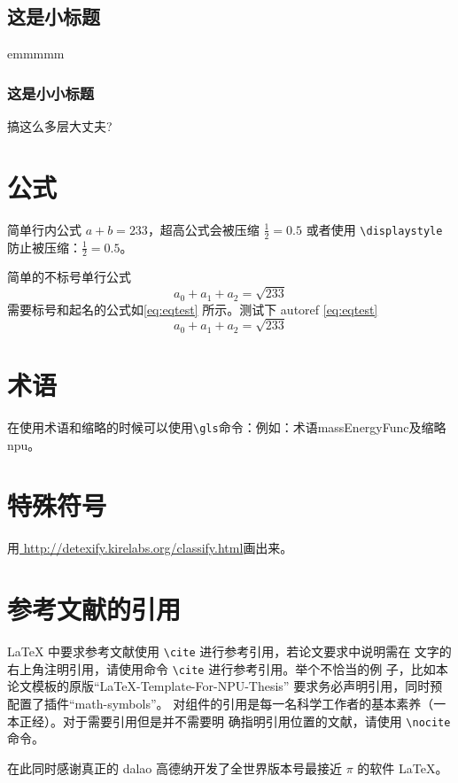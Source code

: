 \documentclass[lang=chs, degree=phd, blindreview=false, winfonts=true, academic=true]{yanputhesis}
\begin{document}
\subsection{这是小标题}
emmmmm
\subsubsection{这是小小标题}
搞这么多层大丈夫?

\section{公式}
简单行内公式 $a+b=233$，超高公式会被压缩 $\frac{1}{2}=0.5$ 或者使用
\lstinline`\displaystyle` 防止被压缩：$\displaystyle \frac{1}{2}=0.5$。

简单的不标号单行公式
$$a_0+a_1+a_2=\sqrt{233}$$
需要标号和起名的公式如\autoref{eq:eqtest} 所示。测试下 autoref \autoref{eq:eqtest}
\begin{equation}
    \label{eq:eqtest}
    a_0 + a_1 + a_2 = \sqrt{233}
\end{equation}

\section{术语}

在使用术语和缩略的时候可以使用\lstinline`\gls`命令：例如：术语\gls{massEnergyFunc}及缩略\gls{npu}。

\section{特殊符号}

用\href{http://detexify.kirelabs.org/classify.html}{
    http://detexify.kirelabs.org/classify.html}画出来。

\section{参考文献的引用}

\LaTeX{} 中要求参考文献使用 \lstinline`\cite` 进行参考引用，若论文要求中说明需在
文字的右上角注明引用，请使用命令 \lstinline`\cite` 进行参考引用。举个不恰当的例
子，比如本论文模板的原版“LaTeX-Template-For-NPU-Thesis”\cite{NWPUThesisLaTeXTemplate}
要求务必声明引用，同时预配置了插件“math-symbols”\cite{MathSymbolsinLaTeXbypolossk}。
对组件的引用是每一名科学工作者的基本素养（一本正经）。对于需要引用但是并不需要明
确指明引用位置的文献，请使用 \lstinline`\nocite` 命令。

在此同时感谢真正的 dalao 高德纳开发了全世界版本号最接近 $\pi$ 的软件
\LaTeX \cite{knuth1986the}\nocite{lamport1989latex}。
\end{document}

